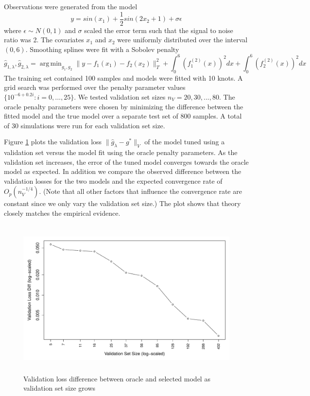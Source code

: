 \documentclass[12pt]{article}
\DeclareMathOperator*{\argmin}{arg\,min}
\begin{document}
Observations were generated from the model
\begin{equation}
y = sin(x_1) + \frac{1}{2} sin(2 x_2 + 1) + \sigma \epsilon
\end{equation}
where $\epsilon \sim N(0,1)$ and $\sigma$ scaled the error term such that the signal to noise ratio was 2.
The covariates $x_1$ and $x_2$ were uniformly distributed over the interval $(0,6)$.
Smoothing splines were fit with a Sobolev penalty
\begin{equation}
\hat{g}_{1, \lambda}, \hat{g}_{2, \lambda} = \argmin_{g_1, g_2} \| y - f_1(x_1) - f_2(x_2) \|_T^2 + \int_0^6 (f_1^{(2)}(x))^2 dx + \int_0^6 (f_2^{(2)}(x))^2 dx
\end{equation}
The training set contained 100 samples and models were fitted with 10 knots. A grid search was performed over the penalty parameter values $\{10^{-6 + 0.2i}: i = 0, ..., 25 \}$. We tested validation set sizes $n_V = 20, 30, ..., 80$. The oracle penalty parameters were chosen by minimizing the difference between the fitted model and the true model over a separate test set of 800 samples. A total of 30 simulations were run for each validation set size.

Figure \ref{fig:emp_v_theory} plots the validation loss $\| \hat{g}_{\lambda} - g^* \|_V$ of the model tuned using a validation set versus the model fit using the oracle penalty parameters. As the validation set increases, the error of the tuned model converges towards the oracle model as expected. In addition we compare the observed difference between the validation losses for the two models and the expected convergence rate of $O_p\left (n_{V}^{-1/4} \right)$. (Note that all other factors that influence the convergence rate are constant since we only vary the validation set size.) The plot shows that theory closely matches the empirical evidence.

\begin{figure}
\label{fig:emp_v_theory}
\caption{
	Validation loss difference between oracle and selected model as validation set size grows
}
\centering
\includegraphics[height=80mm]{../R/figures/validation_size_loss_diff.pdf}
\end{figure}
\end{document}
